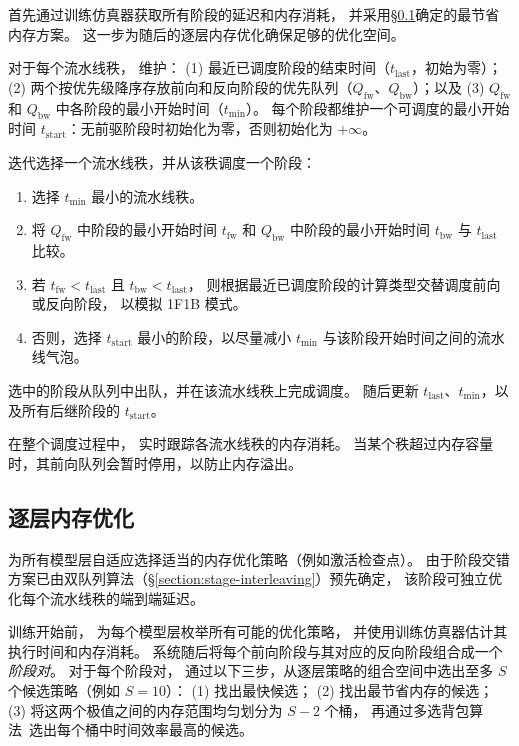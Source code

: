 \sys{} 首先通过训练仿真器获取所有阶段的延迟和内存消耗，
并采用\S\ref{section:memory-optimization}确定的最节省内存方案。
这一步为随后的逐层内存优化确保足够的优化空间。

对于每个流水线秩，\sys{} 维护：
(1) 最近已调度阶段的结束时间（$t_\mathrm{last}$，初始为零）；
(2) 两个按优先级降序存放前向和反向阶段的优先队列（$Q_\mathrm{fw}$、$Q_\mathrm{bw}$）；以及
(3) $Q_\mathrm{fw}$ 和 $Q_\mathrm{bw}$ 中各阶段的最小开始时间（$t_\mathrm{min}$）。
每个阶段都维护一个可调度的最小开始时间 $t_\mathrm{start}$：无前驱阶段时初始化为零，否则初始化为 $+\infty$。

\sys{} 迭代选择一个流水线秩，并从该秩调度一个阶段：
\begin{enumerate}
    \item 选择 $t_\mathrm{min}$ 最小的流水线秩。
    \item 将 $Q_\mathrm{fw}$ 中阶段的最小开始时间 $t_\mathrm{fw}$ 和 $Q_\mathrm{bw}$ 中阶段的最小开始时间 $t_\mathrm{bw}$ 与 $t_\mathrm{last}$ 比较。
    \item 若 $t_\mathrm{fw} < t_\mathrm{last}$ 且 $t_\mathrm{bw} < t_\mathrm{last}$，
          则根据最近已调度阶段的计算类型交替调度前向或反向阶段，
          以模拟 1F1B 模式。
    \item 否则，选择 $t_\mathrm{start}$ 最小的阶段，以尽量减小 $t_\mathrm{min}$ 与该阶段开始时间之间的流水线气泡。
\end{enumerate}

选中的阶段从队列中出队，并在该流水线秩上完成调度。
随后更新 $t_\mathrm{last}$、$t_\mathrm{min}$，以及所有后继阶段的 $t_\mathrm{start}$。

在整个调度过程中，\sys{} 实时跟踪各流水线秩的内存消耗。
当某个秩超过内存容量时，其前向队列会暂时停用，以防止内存溢出。

\subsection{逐层内存优化}
\label{section:memory-optimization}

\sys{} 为所有模型层自适应选择适当的内存优化策略（例如激活检查点）。
由于阶段交错方案已由双队列算法（\S\ref{section:stage-interleaving}）预先确定，
该阶段可独立优化每个流水线秩的端到端延迟。

训练开始前，\sys{} 为每个模型层枚举所有可能的优化策略，
并使用训练仿真器估计其执行时间和内存消耗。
系统随后将每个前向阶段与其对应的反向阶段组合成一个\emph{阶段对}。
对于每个阶段对，\sys{} 通过以下三步，从逐层策略的组合空间中选出至多 $S$ 个候选策略（例如 $S=10$）：
(1) 找出最快候选；
(2) 找出最节省内存的候选；
(3) 将这两个极值之间的内存范围均匀划分为 $S-2$ 个桶，
再通过多选背包算法~\cite{multi-choice-knapsack}选出每个桶中时间效率最高的候选。

